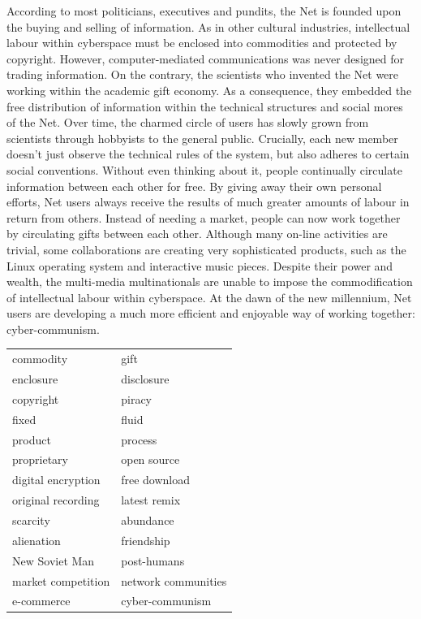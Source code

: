 \documentclass[letterpaper,12pt,english]{sphinxmanual}
\begin{document}
According to most politicians, executives and pundits, the Net is
founded upon the buying and selling of information. As in other cultural
industries, intellectual labour within cyberspace must be enclosed into
commodities and protected by copyright. However, computer-mediated
communications was never designed for trading information. On the
contrary, the scientists who invented the Net were working within the
academic gift economy. As a consequence, they embedded the free
distribution of information within the technical structures and social
mores of the Net. Over time, the charmed circle of users has slowly
grown from scientists through hobbyists to the general public.
Crucially, each new member doesn't just observe the technical rules of
the system, but also adheres to certain social conventions. Without even
thinking about it, people continually circulate information between each
other for free. By giving away their own personal efforts, Net users
always receive the results of much greater amounts of labour in return
from others. Instead of needing a market, people can now work together
by circulating gifts between each other. Although many on-line
activities are trivial, some collaborations are creating very
sophisticated products, such as the Linux operating system and
interactive music pieces. Despite their power and wealth, the
multi-media multinationals are unable to impose the commodification of
intellectual labour within cyberspace. At the dawn of the new
millennium, Net users are developing a much more efficient and enjoyable
way of working together: cyber-communism.

\begin{tabulary}{\linewidth}{|L|L|}
\hline

commodity
 & 
gift
\\

enclosure
 & 
disclosure
\\

copyright
 & 
piracy
\\

fixed
 & 
fluid
\\

product
 & 
process
\\

proprietary
 & 
open source
\\

digital encryption
 & 
free download
\\

original recording
 & 
latest remix
\\

scarcity
 & 
abundance
\\

alienation
 & 
friendship
\\

New Soviet Man
 & 
post-humans
\\

market competition
 & 
network communities
\\

e-commerce
 & 
cyber-communism
\\
\hline\end{tabulary}
\end{document}
